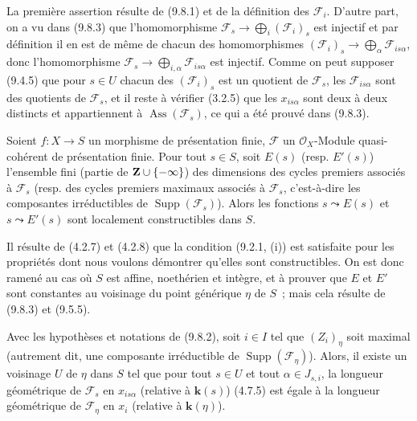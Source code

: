 La première assertion résulte de (9.8.1) et de la définition des
$\mathcal F_i$. D'autre part, on a vu dans (9.8.3) que l'homomorphisme
$\mathcal F_s\to\bigoplus_i(\mathcal F_i)_s$ est injectif et par définition il
en est de même de chacun des homomorphismes
$(\mathcal F_i)_s\to\bigoplus_\alpha\mathcal F_{is\alpha}$, donc
l'homomorphisme $\mathcal F_s\to\bigoplus_{i,\alpha}\mathcal F_{is\alpha}$ est
injectif. Comme on peut supposer (9.4.5) que pour $s\in U$ chacun des
$(\mathcal F_i)_s$ est un quotient de $\mathcal F_s$, les
$\mathcal F_{is\alpha}$ sont des quotients de $\mathcal F_s$, et il reste à
vérifier (3.2.5) que les $x_{is\alpha}$ sont deux à deux distincts et
appartiennent à $\operatorname{Ass}(\mathcal F_s)$, ce qui a été prouvé dans
(9.8.3).

\begin{proposition}[9.8.5]
\label{IV.9.8.5-fr}
Soient $f:X\to S$ un morphisme de présentation finie, $\mathcal F$ un
$\mathcal O_X$-Module quasi-cohérent de présentation finie. Pour tout $s\in S$,
soit $E(s)$ \textup{(resp. $E'(s)$)} l'ensemble fini (partie de
$\mathbf Z\cup\{-\infty\}$) des dimensions des cycles premiers associés à
$\mathcal F_s$ \textup{(resp.} des cycles premiers maximaux associés à $\mathcal F_s$,
c'est-à-dire les composantes irréductibles de $\operatorname{Supp}(\mathcal F_s)$\textup{)}.
Alors les fonctions $s\leadsto E(s)$ et $s\leadsto E'(s)$ sont localement
constructibles dans $S$.
\end{proposition}


Il résulte de (4.2.7) et (4.2.8) que la condition (9.2.1, (i)) est satisfaite
pour les propriétés dont nous voulons démontrer qu'elles sont constructibles.
On est donc ramené au cas où $S$ est affine, noethérien et intègre, et à prouver
que $E$ et $E'$ sont constantes au voisinage du point générique $\eta$ de $S$~;
mais cela résulte de (9.8.3) et (9.5.5).

\begin{proposition}[9.8.6]
\label{IV.9.8.6-fr}
Avec les hypothèses et notations de \textup{(9.8.2)}, soit $i\in I$ tel que $(Z_i)_\eta$
soit maximal (autrement dit, une composante irréductible de
$\operatorname{Supp}(\mathcal F_\eta)$). Alors, il existe un voisinage $U$ de
$\eta$ dans $S$ tel que pour tout $s\in U$ et tout $\alpha\in J_{s,i}$, la
longueur géométrique de $\mathcal F_s$ en $x_{is\alpha}$ (relative à
$\boldsymbol{k}(s)$) \textup{(4.7.5)} est égale à la longueur géométrique de
$\mathcal F_\eta$ en $x_i$ (relative à $\boldsymbol{k}(\eta)$).
\end{proposition}

